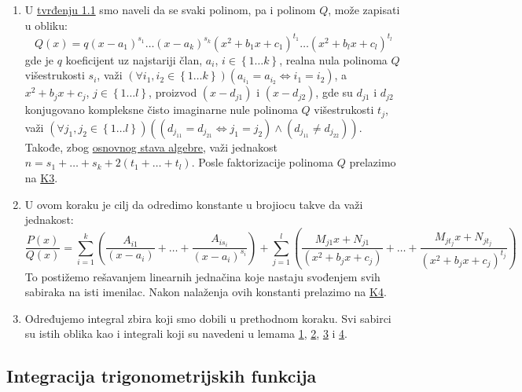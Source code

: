 \documentclass{article}
\begin{document}
\begin{algbox}
\begin{enumerate}[label=\text{K\arabic*:}]
        \item\label{algoritam_1_K2}
              U \hyperref[tvrđenje_1.1]{tvrđenju 1.1} smo naveli da se
              svaki polinom, pa i polinom $Q$, može zapisati u obliku:
              $$Q\left(x\right) = q\left(x - a_1\right)^{s_1}\dotsc\left(x-a_k\right)^{s_k}\left(x^2 + b_1x + c_1\right)^{t_1}\dotsc\left(x^2 + b_lx + c_l\right)^{t_l}$$
              gde je $q$ koeficijent uz najstariji član,
              $a_i$, $i\in\left\{1\dotsc k\right\}$, realna nula polinoma $Q$ višestrukosti $s_i$, važi $\left(\forall i_1,i_2\in\left\{1\dotsc k\right\}\right)\left(a_{i_1}=a_{i_2}\iff i_1=i_2\right)$,
              a $x^2+b_jx+c_j$, $j\in\left\{1\dotsc l\right\}$,
              proizvod $\left(x-d_{j1}\right)$ i $\left(x-d_{j2}\right)$,
              gde su $d_{j1}$ i $d_{j2}$ konjugovano kompleksne čisto imaginarne nule polinoma $Q$
              višestrukosti $t_j$, važi $\left(\forall j_1,j_2\in\left\{1\dotsc l\right\}\right)\left(\left(d_{j_11}=d_{j_21}\iff j_1=j_2\right)\land\left(d_{j_11}\neq d_{j_22}\right)\right)$.
              Takođe, zbog \hyperref[podsetnik_stava_1]{osnovnog stava algebre}, važi jednakost $n=s_1+\dotsc+s_k+2\left(t_1+\dotsc+t_l\right)$.
              Posle faktorizacije polinoma $Q$ prelazimo na \hyperref[algoritam_1_K3]{K3}.
        \item\label{algoritam_1_K3}
              U ovom koraku je cilj da odredimo konstante u brojiocu takve da važi jednakost:
              $$\frac{P\left(x\right)}{Q\left(x\right)}=\sum_{i = 1}^k\left(\frac{A_{i1}}{\left(x-a_i\right)}+\dotsc+\frac{A_{is_i}}{\left(x-a_i\right)^{s_i}}\right) + \sum_{j = 1}^l\left( \frac{M_{j1}x + N_{j1}}{\left(x^2+b_jx+c_j\right)}+\dotsc+\frac{M_{jt_j}x + N_{jt_j}}{\left(x^2 + b_jx + c_j\right)^{t_j}}\right)$$
              To postižemo rešavanjem linearnih jednačina koje
              nastaju svođenjem svih sabiraka na isti imenilac.
              Nakon nalaženja ovih konstanti prelazimo na \hyperref[algoritam_1_K4]{K4}.
        \item\label{algoritam_1_K4}
              Određujemo integral zbira koji smo dobili u prethodnom koraku.
              Svi sabirci su istih oblika kao i integrali koji su navedeni u lemama
              \hyperref[lema_1.1]{1}, \hyperref[lema_1.2]{2}, \hyperref[lema_1.3]{3} i \hyperref[lema_1.4]{4}.

    \end{enumerate}
\end{algbox}

\subsection{Integracija trigonometrijskih funkcija}
\end{document}
